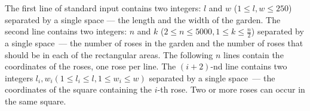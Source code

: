 The first line of standard input contains two integers: $l$ and $w$ ($1 \le l,w \le 250$) separated by a single space
--- the length and the width of the garden. The second line contains two integers: $n$ and $k$ ($2 \le n \le 5000, 1 \le k \le \frac{n}{2}$) separated by a single space~--- the number of roses in the garden and the number of roses that
should be in each of the rectangular areas. The following $n$ lines contain the coordinates of the roses, one rose
per line. The $(i+2)$-nd line contains two integers $l_i , w_i (1 \le l_i \le l, 1 \le w_i \le w)$ separated by a single space~--- the coordinates of the square containing the $i$-th rose. Two or more roses can occur in the same square.

